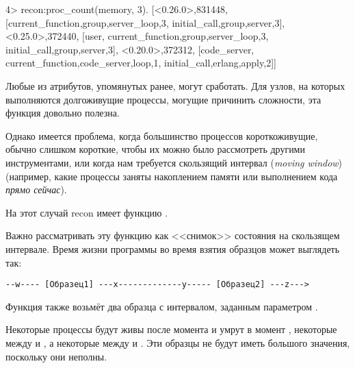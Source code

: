 \begin{VerbatimEshell}
4> recon:proc_count(memory, 3).
[{<0.26.0>,831448,
  [{current_function,{group,server_loop,3}},
   {initial_call,{group,server,3}}]},
 {<0.25.0>,372440,
  [user,
   {current_function,{group,server_loop,3}},
   {initial_call,{group,server,3}}]},
 {<0.20.0>,372312,
  [code_server,
   {current_function,{code_server,loop,1}},
   {initial_call,{erlang,apply,2}}]}]
\end{VerbatimEshell}

Любые из атрибутов, упомянутых ранее, могут сработать. Для узлов, на которых выполняются долгоживущие процессы, могущие причинить сложности, эта функция довольно полезна.

Однако имеется проблема, когда большинство процессов короткоживущие, обычно слишком короткие, чтобы их можно было рассмотреть другими инструментами, или когда нам требуется скользящий интервал (\emph{moving window}) (например, какие процессы заняты накоплением памяти или выполнением кода \emph{прямо сейчас}).

На этот случай recon имеет функцию  .

Важно рассматривать эту функцию как <<снимок>> состояния на скользящем интервале. Время жизни программы во время взятия образцов может выглядеть так:

\begin{Verbatim}
--w---- [Образец1] ---x-------------y----- [Образец2] ---z--->
\end{Verbatim}

Функция также возьмёт два образца с интервалом, заданным параметром .

Некоторые процессы будут живы после момента  и умрут в момент , некоторые между  и , а некоторые между  и . Эти образцы не будут иметь большого значения, поскольку они неполны.

